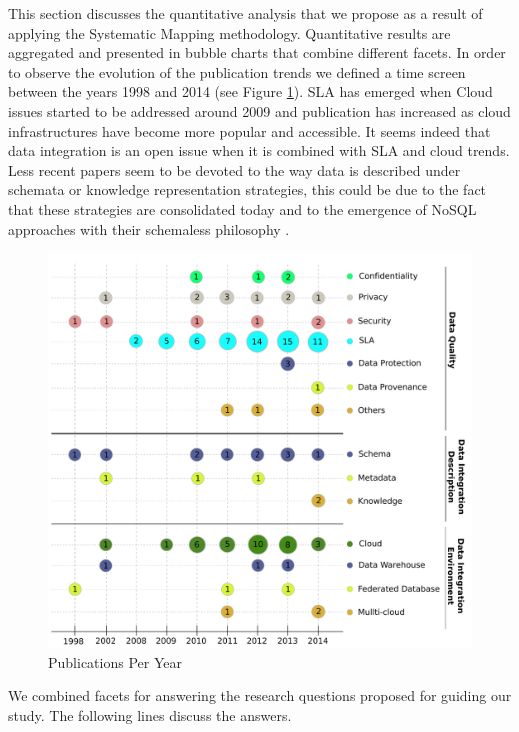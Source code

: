 This section discusses the quantitative analysis that we propose as a result of applying the Systematic Mapping methodology.
Quantitative results are aggregated and presented in bubble charts that combine different facets. 
In order to observe the evolution of the publication trends we defined a time screen between the years 1998 and 2014 (see Figure \ref{fig:pubperyear}). SLA has emerged when Cloud issues started to be addressed around 2009 and publication has increased as cloud infrastructures have become more popular and accessible. It seems indeed that data integration is an open issue when it is combined with SLA and cloud trends. Less recent papers seem to be devoted to the way data is described under schemata or knowledge representation strategies, this could be due to the fact that these strategies are consolidated today and  to the emergence of NoSQL approaches with their schemaless philosophy \cite{sadalage2012nosql}. 

\begin{figure}[h!]
\centering
\includegraphics[scale=0.41]{figs/bubble-charts/PublicationsPerYear.pdf} 
\caption{Publications Per Year}\label{fig:pubperyear}
\end{figure}



We combined facets for answering the research questions proposed for guiding our
study. The following lines discuss the answers.

